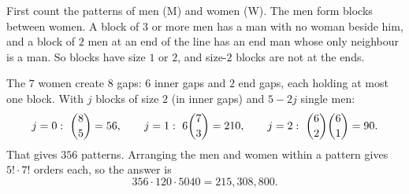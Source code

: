 First count the patterns of men (M) and women (W). The men form blocks between women. A block of $3$ or more men has a man with no woman beside him, and a block of $2$ men at an end of the line has an end man whose only neighbour is a man. So blocks have size $1$ or $2$, and size-$2$ blocks are not at the ends.

The $7$ women create $8$ gaps: $6$ inner gaps and $2$ end gaps, each holding at most one block. With $j$ blocks of size $2$ (in inner gaps) and $5-2j$ single men:
\[j=0:\ \dbinom85=56,\qquad j=1:\ 6\dbinom73=210,\qquad j=2:\ \dbinom62\dbinom61=90.\]
That gives $356$ patterns. Arranging the men and women within a pattern gives $5!\cdot7!$ orders each, so the answer is
\[356\cdot120\cdot5040=\boxed{215{,}308{,}800}.\]
